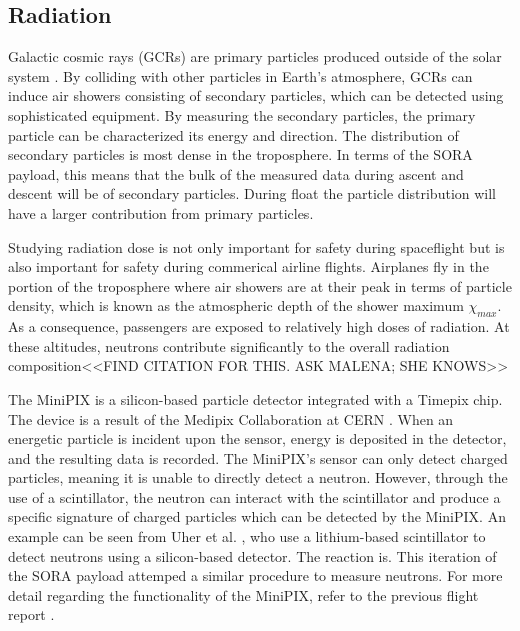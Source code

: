 \subsection{Radiation}
\label{sec: Radiation Background}

Galactic cosmic rays (GCRs) are primary particles produced outside of the solar system \cite{GCRs}.
By colliding with other particles in Earth's atmosphere, GCRs can induce air showers consisting of secondary particles, which can be detected using sophisticated equipment.
By measuring the secondary particles, the primary particle can be characterized its energy and direction. 
The distribution of secondary particles \cite{Frank} is most dense in the troposphere. 
In terms of the SORA payload, this means that the bulk of the measured data during ascent and descent will 
be of secondary particles. During float the particle distribution will have a larger contribution from primary particles.

Studying radiation dose is not only important for safety during spaceflight but is also important for safety during commerical airline flights.
Airplanes fly in the portion of the troposphere where air showers are at their peak in terms of particle density, which is known as the atmospheric depth of the shower maximum $\chi _{max}$. As a consequence, passengers are exposed to relatively high doses of radiation.
At these altitudes, neutrons contribute significantly to the overall radiation composition<<FIND CITATION FOR THIS. ASK MALENA; SHE KNOWS>>

The MiniPIX \cite{silicon_sensor} is a silicon-based particle detector integrated with a Timepix \cite{timepix} chip. The device is a result of the Medipix Collaboration at CERN \cite{medipix}. 
When an energetic particle is incident upon the sensor, energy is deposited in the detector, and the resulting data is recorded.
The MiniPIX's sensor can only detect charged particles, meaning it is unable to directly detect a neutron. However, through the use of a scintillator, the neutron can interact with the scintillator and produce a specific signature of charged particles which can be detected by the MiniPIX.
An example can be seen from Uher et al. \cite{Uher}, who use a lithium-based scintillator to detect neutrons using a silicon-based detector. The reaction is.
This iteration of the SORA payload attemped a similar procedure to measure neutrons. 
For more detail regarding the functionality of the MiniPIX, refer to the previous flight report \cite{SORA}.

